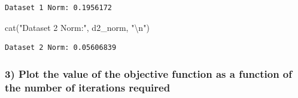 \documentclass[
  letterpaper,
  DIV=11,
  numbers=noendperiod]{scrartcl}
\newenvironment{Shaded}{\begin{snugshade}}{\end{snugshade}}
\newcommand{\FunctionTok}[1]{\textcolor[rgb]{0.28,0.35,0.67}{#1}}
\newcommand{\NormalTok}[1]{\textcolor[rgb]{0.00,0.23,0.31}{#1}}
\newcommand{\SpecialCharTok}[1]{\textcolor[rgb]{0.37,0.37,0.37}{#1}}
\newcommand{\StringTok}[1]{\textcolor[rgb]{0.13,0.47,0.30}{#1}}
\begin{document}
\begin{verbatim}
Dataset 1 Norm: 0.1956172 
\end{verbatim}

\begin{Shaded}
\begin{Highlighting}[]
\FunctionTok{cat}\NormalTok{(}\StringTok{"Dataset 2 Norm:"}\NormalTok{, d2\_norm, }\StringTok{"}\SpecialCharTok{\textbackslash{}n}\StringTok{"}\NormalTok{)}
\end{Highlighting}
\end{Shaded}

\begin{verbatim}
Dataset 2 Norm: 0.05606839 
\end{verbatim}

\subsubsection{3) Plot the value of the objective function as a function
of the number of iterations
required}\label{plot-the-value-of-the-objective-function-as-a-function-of-the-number-of-iterations-required}
\end{document}
